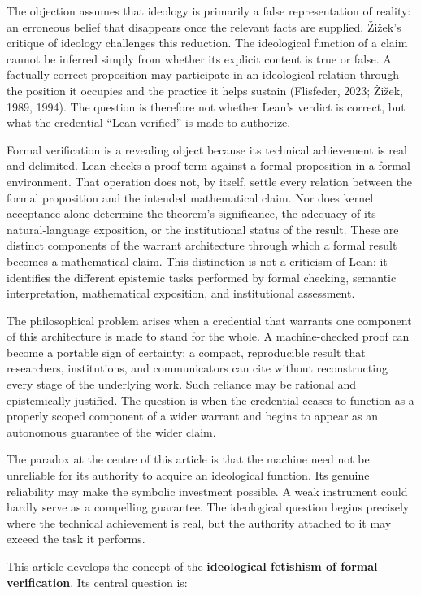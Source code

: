 \documentclass[sn-apa]{sn-jnl}
\begin{document}
The objection assumes that ideology is primarily a false representation of reality: an erroneous belief that disappears once the relevant facts are supplied. Žižek’s critique of ideology challenges this reduction. The ideological function of a claim cannot be inferred simply from whether its explicit content is true or false. A factually correct proposition may participate in an ideological relation through the position it occupies and the practice it helps sustain (Flisfeder, 2023; Žižek, 1989, 1994). The question is therefore not whether Lean’s verdict is correct, but what the credential “Lean-verified” is made to authorize.

Formal verification is a revealing object because its technical achievement is real and delimited. Lean checks a proof term against a formal proposition in a formal environment. That operation does not, by itself, settle every relation between the formal proposition and the intended mathematical claim. Nor does kernel acceptance alone determine the theorem’s significance, the adequacy of its natural-language exposition, or the institutional status of the result. These are distinct components of the warrant architecture through which a formal result becomes a mathematical claim. This distinction is not a criticism of Lean; it identifies the different epistemic tasks performed by formal checking, semantic interpretation, mathematical exposition, and institutional assessment.

The philosophical problem arises when a credential that warrants one component of this architecture is made to stand for the whole. A machine-checked proof can become a portable sign of certainty: a compact, reproducible result that researchers, institutions, and communicators can cite without reconstructing every stage of the underlying work. Such reliance may be rational and epistemically justified. The question is when the credential ceases to function as a properly scoped component of a wider warrant and begins to appear as an autonomous guarantee of the wider claim.

The paradox at the centre of this article is that the machine need not be unreliable for its authority to acquire an ideological function. Its genuine reliability may make the symbolic investment possible. A weak instrument could hardly serve as a compelling guarantee. The ideological question begins precisely where the technical achievement is real, but the authority attached to it may exceed the task it performs.

This article develops the concept of the \textbf{ideological fetishism of formal verification}. Its central question is:
\end{document}
